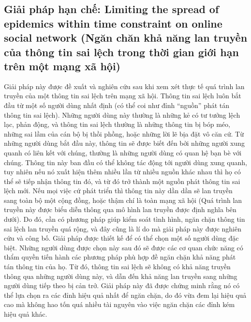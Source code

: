  	 	\subsection{Giải pháp hạn chế: Limiting the spread of epidemics within time constraint on online social network (Ngăn chăn khả năng lan truyền của thông tin sai lệch trong thời gian giới hạn trên một mạng xã hội)}
 	Giải pháp này được đề xuất và nghiên cứu sau khi xem xét thực tế quá trình lan truyền của một thông tin sai lệch trên mạng xã hội. Thông tin sai lệch luôn bắt đầu từ một số người dùng nhất định (có thể coi như đỉnh “nguồn” phát tán thông tin sai lệch). Những người dùng này thường là những kẻ có tư tưởng lệch lạc, phản động, và thông tin sai lệch thường là những thông tin bị bóp méo, những sai lầm của cán bộ bị thồi phồng, hoặc những lời lẽ bịa đặt vô căn cứ. Từ những người dùng bắt đầu này, thông tin sẽ được biết đến bởi những người xung quanh có liên kết với chúng, thường là những người dùng có quan hệ bạn bè với chúng. Thông tin này ban đầu có thể không tác động tới người dùng xung quanh, tuy nhiên nếu nó xuất hiện thêm nhiều lần từ nhiều nguồn khác nhau thì họ có thể sẽ tiếp nhận thông tin đó, và từ đó trở thành một nguồn phát thông tin sai lệch mới. Nếu mọi việc cứ phát triển thì thông tin này dần dần sẽ lan truyền sang toàn bộ một cộng đồng, hoặc thậm chí là toàn mạng xã hội (Quá trình lan truyền này được biểu diễn thông qua mô hình lan truyền được định nghĩa bên dưới). Do đó, cần có phương pháp giúp kiểm soát tình hình, ngăn chặn thông tin sai lệch lan truyền quá rộng, và đây cũng là lí do mà giải pháp này được nghiên cứu và công bố. Giải pháp được thiết kế để có thể chọn một số người dùng đặc biệt. Những người dùng được chọn này sau đó sẽ được các cơ quan chức năng có thẩm quyền tiến hành các phương pháp phù hợp đề ngăn chặn khả năng phát tán thông tin của họ. Từ đó, thông tin sai lệch sẽ không có khả năng truyền thông qua những người dùng này, và dẫn đến khả năng lan truyền sang những người dùng tiếp theo bị cản trở. Giải pháp này đã được chứng minh rằng nó có thể lựa chọn ra các đỉnh hiệu quả nhất để ngăn chặn, do đó vừa đem lại hiệu quả cao mà không hao tốn quá nhiều tài nguyên vào việc ngăn chặn các đỉnh kém hiệu quả khác.
